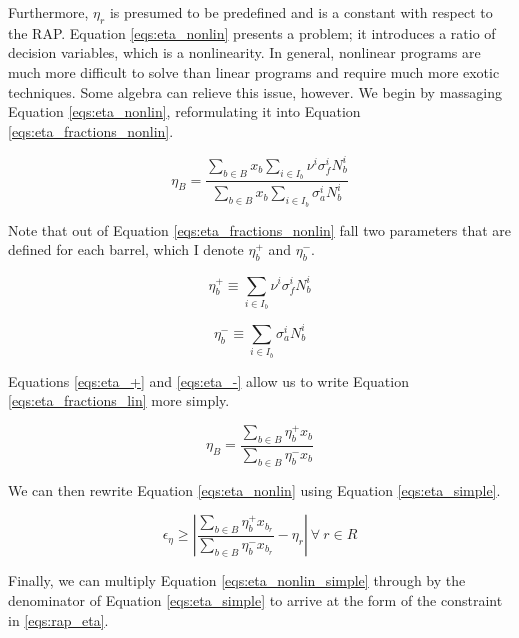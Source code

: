 Furthermore, $\eta_{r}$ is presumed to be predefined and is a constant with
respect to the RAP. Equation \ref{eqs:eta_nonlin} presents a problem; it
introduces a ratio of decision variables, which is a nonlinearity. In general,
nonlinear programs are much more difficult to solve than linear programs and
require much more exotic techniques. Some algebra can relieve this issue,
however. We begin by massaging Equation \ref{eqs:eta_nonlin}, reformulating it
into Equation \ref{eqs:eta_fractions_nonlin}.

\begin{equation}
\label{eqs:eta_fractions_lin}
\eta_{B} = \frac{\sum_{b \in B} x_{b} \sum_{i \in I_{b}} \nu^{i} \sigma_{f}^{i} N_{b}^{i}}
                {\sum_{b \in B} x_{b} \sum_{i \in I_{b}} \sigma_{a}^{i} N_{b}^{i}}
\end{equation}

Note that out of Equation \ref{eqs:eta_fractions_nonlin} fall two parameters
that are defined for each barrel, which I denote $\eta_{b}^{+}$ and
$\eta_{b}^{-}$.

\begin{equation}
\label{eqs:eta_+}
\eta_{b}^{+} \equiv \sum_{i \in I_{b}} \nu^{i} \sigma_{f}^{i} N_{b}^{i}
\end{equation}

\begin{equation}
\label{eqs:eta_-}
\eta_{b}^{-} \equiv \sum_{i \in I_{b}} \sigma_{a}^{i} N_{b}^{i}
\end{equation}

Equations \ref{eqs:eta_+} and \ref{eqs:eta_-} allow us to write
Equation \ref{eqs:eta_fractions_lin} more simply.

\begin{equation}
\label{eqs:eta_simple}
\eta_{B} = \frac{\sum_{b \in B} \eta_{b}^{+} x_{b}}
                {\sum_{b \in B} \eta_{b}^{-} x_{b}}
\end{equation}

We can then rewrite Equation \ref{eqs:eta_nonlin} using
Equation \ref{eqs:eta_simple}.

\begin{equation}
\label{eqs:eta_nonlin_simple}
\epsilon_{\eta} \geq \left| 
\frac{\sum_{b \in B} \eta_{b}^{+} x_{b_r}}
     {\sum_{b \in B} \eta_{b}^{-} x_{b_r}}
- \eta_{r} \right|
\: \forall \: r \in R
\end{equation}

Finally, we can multiply Equation \ref{eqs:eta_nonlin_simple} through by the
denominator of Equation \ref{eqs:eta_simple} to arrive at the form of the
constraint in \ref{eqs:rap_eta}.

